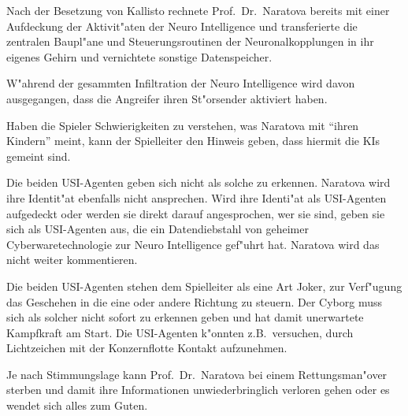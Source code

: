 \begin{remarks}
	Nach der Besetzung von Kallisto rechnete Prof.~Dr.~Naratova bereits mit einer Aufdeckung der Aktivit"aten der Neuro Intelligence und transferierte die zentralen Baupl"ane und Steuerungsroutinen der Neuronalkopplungen in ihr eigenes Gehirn und vernichtete sonstige Datenspeicher.
	
	W"ahrend der gesammten Infiltration der Neuro Intelligence wird davon ausgegangen, dass die Angreifer ihren St"orsender aktiviert haben.
	
	Haben die Spieler Schwierigkeiten zu verstehen, was Naratova mit "`ihren Kindern"' meint, kann der Spielleiter den Hinweis geben, dass hiermit die KIs gemeint sind.
	
	Die beiden USI-Agenten geben sich nicht als solche zu erkennen. Naratova wird ihre Identit"at ebenfalls nicht ansprechen. Wird ihre Identi"at als USI-Agenten aufgedeckt oder werden sie direkt darauf angesprochen, wer sie sind, geben sie sich als USI-Agenten aus, die ein Datendiebstahl von geheimer Cyberwaretechnologie zur Neuro Intelligence gef"uhrt hat. Naratova wird das nicht weiter kommentieren.
	
	Die beiden USI-Agenten stehen dem Spielleiter als eine Art Joker, zur Verf"ugung das Geschehen in die eine oder andere Richtung zu steuern. Der Cyborg muss sich als solcher nicht sofort zu erkennen geben und hat damit unerwartete Kampfkraft am Start. Die USI-Agenten k"onnten z.B.~versuchen, durch Lichtzeichen mit der Konzernflotte Kontakt aufzunehmen.
	
	Je nach Stimmungslage kann Prof.~Dr.~Naratova bei einem Rettungsman"over sterben und damit ihre Informationen unwiederbringlich verloren gehen oder es wendet sich alles zum Guten.
\end{remarks}